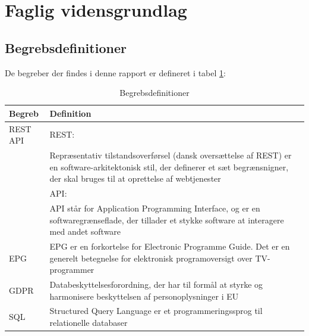 \section{Faglig vidensgrundlag}

\subsection{Begrebsdefinitioner} 
De begreber der findes i denne rapport er defineret i tabel \ref{tab:Begrebsdefinitioner}:

\begin{table}[h]
    \centering
\begin{tabular}{|p{4cm}|p{12cm}|}
\hline
\textbf{Begreb} & \textbf{Definition} \\
\hline
REST API    & REST: \\
            & Repræsentativ tilstandsoverførsel (dansk oversættelse af REST) er en software-arkitektonisk stil, der definerer et sæt begrænsnigner, der skal bruges til at oprettelse af webtjenester\\
            & API: \\
            & API står for Application Programming Interface, og er en softwaregrænseflade, der tillader et stykke software at interagere med andet software \\
\hline
EPG         & EPG er en forkortelse for Electronic Programme Guide. Det er en generelt betegnelse for elektronisk programoversigt over TV-programmer         \\
\hline
GDPR        & Databeskyttelsesforordning, der har til formål at styrke og harmonisere beskyttelsen af personoplysninger i EU \\
\hline
SQL         & Structured Query Language er et programmeringssprog til relationelle databaser\\
\hline
 \end{tabular}
    \caption{Begrebsdefinitioner}
    \label{tab:Begrebsdefinitioner}
\end{table}

